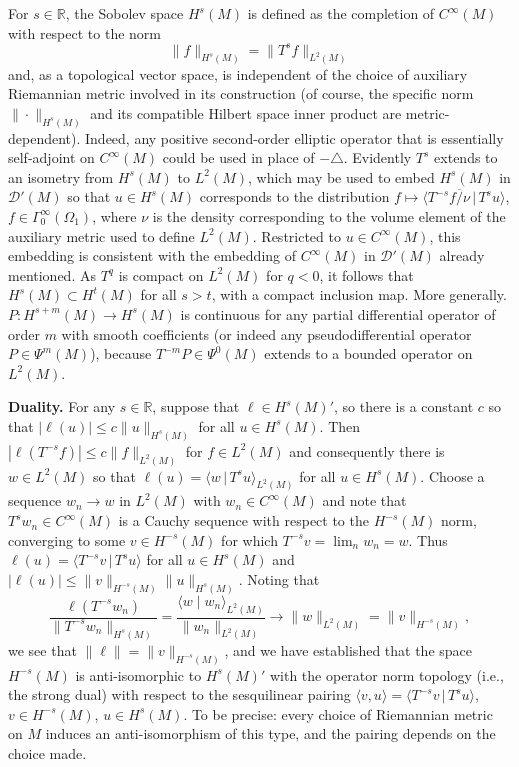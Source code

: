 \documentclass[pdftex]{sigma}
\numberwithin{equation}{section}
\newcommand{\RR}{{\mathbb R}}
\newcommand{\GoinX}[1]{\Gamma_0^\infty({#1})}
\newcommand{\DD}{{\mathscr D}}
\newcommand{\ip}[2]{{\big\langle #1 \, \big|\, #2\big\rangle}}
\begin{document}
 For $s\in\RR$, the Sobolev space $H^s(M)$ is defined as the completion of $C^\infty(M)$ with respect to the norm
 \begin{equation*}
 	\|f\|_{H^s(M)} = \| T^s f\|_{L^2(M)}
 \end{equation*}
 and, as a topological vector space, is independent of the choice of auxiliary Riemannian metric involved in its construction (of course, the specific norm $\|\cdot\|_{H^s(M)}$
 and its compatible Hilbert space inner product
 are metric-dependent). Indeed, any positive second-order elliptic operator that is essentially self-adjoint on $C^\infty(M)$ could be used in place of $-\triangle$.
 Evidently $T^s$ extends to an isometry from $H^s(M)$ to $L^2(M)$, which may be used to embed $H^s(M)$ in $\DD'(M)$ so that $u \in H^s(M)$ corresponds to the distribution $f\mapsto \ip{T^{-s}\overline{f/\nu}}{T^su}$, $f\in\GoinX{\Omega_1}$, where $\nu$ is the density corresponding to the
 volume element of the auxiliary metric used to define $L^2(M)$. Restricted to $u\in C^\infty(M)$, this embedding is consistent with the embedding of $C^\infty(M)$ in $\DD'(M)$ already mentioned.
 As $T^q$ is compact on $L^2(M)$ for $q<0$, it follows that $H^s(M)\subset H^t(M)$ for all $s>t$, with a compact inclusion map. More generally. $P\colon H^{s+m}(M)\to H^s(M)$ is continuous for any partial differential operator of order $m$ with smooth coefficients (or indeed any pseudodifferential operator $P\in \Psi^{m}(M)$), because $T^{-m}P\in \Psi^0(M)$ extends to a bounded operator on $L^2(M)$.


 {\bf Duality.} For any $s\in\RR$, suppose that $\ell\in H^s(M)'$, so there is a constant $c$ so that $|\ell(u)|\le c\|u\|_{H^s(M)}$ for all $u\in H^s(M)$. Then $|\ell(T^{-s}f)|\le c\|f\|_{L^2(M)}$ for $f\in L^2(M)$ and consequently there is $w\in L^2(M)$ so that $\ell(u) =\langle w\,|\, T^{s}u\rangle_{L^2(M)}$ for all $u\in H^s(M)$. Choose a sequence $w_n\to w$ in $L^2(M)$ with
 $w_n\in C^\infty(M)$ and note that $T^s w_n\in C^\infty(M)$ is a Cauchy sequence with respect to the
 $H^{-s}(M)$ norm, converging to some $v\in H^{-s}(M)$ for which
 $T^{-s}v=\lim_n w_n=w$. Thus
 $\ell(u)=\langle T^{-s}v\, |\,T^su\rangle$ for all $u\in H^s(M)$ and
 $|\ell(u)|\le \|v\|_{H^{-s}(M)}\|u\|_{H^s(M)}$. Noting that
 \begin{equation*}
 	\frac{\ell(T^{-s}w_n)}{\|T^{-s}w_n\|_{H^s(M)}}=\frac{\langle w\mid w_n \rangle_{L^2(M)}}{\|w_n\|_{L^2(M)}}\to \|w\|_{L^2(M)} = \|v\|_{H^{-s}(M)},
 \end{equation*}
 we see that $\|\ell\|=\|v\|_{H^{-s}(M)}$, and we have established that
 the space $H^{-s}(M)$ is anti-isomorphic to $H^s(M)'$ with the operator norm topology (i.e.,
 the strong dual) with respect to the sesquilinear pairing $\langle v,u\rangle = \langle T^{-s}v\,|\, T^s u\rangle$, $v\in H^{-s}(M)$, $u\in H^s(M)$. To be precise: every
 choice of Riemannian metric on $M$ induces an anti-isomorphism of this type, and the
 pairing depends on the choice made.
\end{document}

